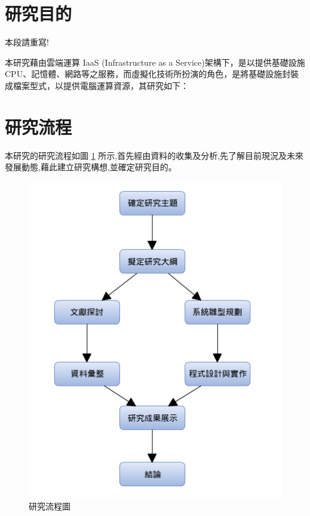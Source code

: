   \section{研究目的}

本段請重寫!

本研究藉由雲端運算 IaaS (Infrastructure as a Service)架構下，是以提供基礎設施CPU、記憶體、網路等之服務，而虛擬化技術所扮演的角色，是將基礎設施封裝成檔案型式，以提供電腦運算資源，其研究如下：

  \section{研究流程}
本研究的研究流程如圖 \ref{fig:研究流程圖} 所示,首先經由資料的收集及分析,先了解目前現況及未來發展動態,藉此建立研究構想,並確定研究目的。

\begin{figure}[h]
\centering \includegraphics[width=17cm,keepaspectratio]{ch2/研究流程圖.png}
\caption{\label{fig:研究流程圖}研究流程圖}
\end{figure}


